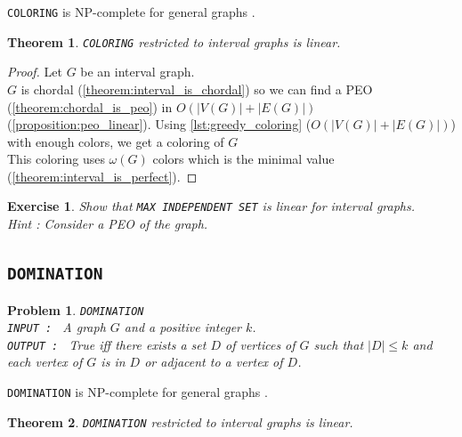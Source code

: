 \documentclass{article}
\newtheorem{theorem}{Theorem}[section]
\newtheorem{problem}{Problem}[section]
\newtheorem{exercise}{Exercise}
\begin{document}
\texttt{COLORING} is NP-complete for general graphs \cite{karp}.

\begin{theorem}
    \texttt{COLORING} restricted to interval graphs is linear.
\end{theorem}

\begin{proof}
    Let $G$ be an interval graph. \\
    $G$ is chordal (\cref{theorem:interval_is_chordal}) so we can find a PEO (\cref{theorem:chordal_is_peo})
    in $O(|V(G)| + |E(G)|)$ (\cref{proposition:peo_linear}).
    Using \cref{lst:greedy_coloring} ($O(|V(G)|+|E(G)|)$) with enough colors, we get a coloring of $G$ \\
    This coloring uses $\omega(G)$ colors which is the minimal value (\cref{theorem:interval_is_perfect}).
\end{proof}

\begin{exercise}
    Show that \texttt{MAX INDEPENDENT SET} is linear for interval graphs. \\
    \textit{Hint : } Consider a PEO of the graph.
\end{exercise}

\subsection{\texttt{DOMINATION}}

\begin{problem}
    \texttt{DOMINATION} \\
    \texttt{INPUT : } A graph $G$ and a positive integer $k$.\\
    \texttt{OUTPUT : } True iff there exists a set $D$ of vertices of $G$ such that $|D| \leq k$ and each vertex of $G$ is in $D$ or adjacent to a vertex of $D$.
\end{problem}

\texttt{DOMINATION} is NP-complete for general graphs \cite{karp}.

\begin{theorem}
    \texttt{DOMINATION} restricted to interval graphs is linear.
\end{theorem}
\end{document}
